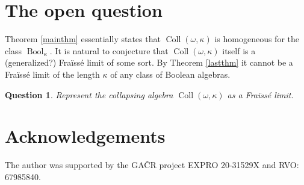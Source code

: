 \documentclass[11pt]{amsart}
\newtheorem{prob}[thm]{Question}
\theoremstyle{definition}
\DeclareMathOperator{\Bool}{Bool}
\newcommand{\coll}{\operatorname{Coll}(\omega,\kappa)}
\begin{document}
\section{The open question}
Theorem \ref{mainthm} essentially states that $\coll$ is homogeneous for the class $\Bool_\kappa$. It is natural to conjecture that $\coll$ itself is a (generalized?) Fra\"iss\'e limit of some sort. By Theorem \ref{lastthm} it cannot be a Fra\"iss\'e limit of the length $\kappa$ of any class of Boolean algebras.

\begin{prob}
    Represent the collapsing algebra $\coll$ as a Fra\"iss\'e limit.
\end{prob}

\section*{Acknowledgements}
The author was supported by the GA\v{C}R project EXPRO 20-31529X and RVO: 67985840.
	
\end{document}
